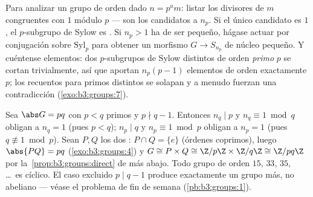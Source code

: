 \begin{method}\label{met:b3:groups:sylowmethod}
Para analizar un grupo de orden dado $n = p^a m$: listar los divisores
de $m$ congruentes con $1$ módulo $p$ --- son los candidatos a $n_p$. Si
el único candidato es $1$, el $p$-subgrupo de Sylow es
. Si $n_p > 1$ ha de ser pequeño,
hágase actuar por conjugación sobre $\mathrm{Syl}_p$ para obtener un
morfismo $G \to S_{n_p}$ de núcleo pequeño. Y cuéntense elementos: dos
$p$-subgrupos de Sylow distintos de orden \emph{primo} $p$ se cortan
trivialmente, así que aportan $n_p(p-1)$ elementos de orden exactamente
$p$; los recuentos para primos distintos se solapan y a menudo fuerzan
una contradicción
(\cref{exo:b3:groups:7}).
\end{method}

\begin{example}\label{ex:b3:groups:pq}
Sea $\abs G = pq$ con $p < q$ primos y $p \nmid q - 1$. Entonces
$n_q \mid p$ y $n_q \equiv 1 \bmod q$ obligan a $n_q = 1$ (pues $p <
q$); $n_p \mid q$ y $n_p \equiv 1 \bmod p$ obligan a $n_p = 1$ (pues $q
\not\equiv 1 \bmod p$). Sean $P, Q$ los dos 
: $P
\cap Q = \{e\}$ (órdenes coprimos), luego $\abs{PQ} = pq$
(\cref{exo:b3:groups:4}) y $G \cong P \times Q \cong \Z/p\Z
\times \Z/q\Z \cong \Z/pq\Z$ por la~\cref{prop:b3:groups:direct} de más
abajo. Todo grupo de orden $15$, $33$, $35$, \dots\ es cíclico. El caso
excluido $p \mid q - 1$ produce exactamente un grupo más, no abeliano
--- véase el problema de fin de semana (\cref{pb:b3:groups:1}).
\end{example}

